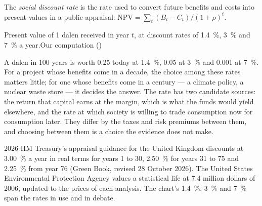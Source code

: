 \begin{definition}\label{def:b3:cost-benefit-analysis:discount-rate}
The \emph{social discount rate} is the rate used to convert future benefits and costs
into present values in a public appraisal: $\mathrm{NPV} = \sum_t (B_t - C_t)/(1 + \rho)^t$.
\end{definition}

\begin{omchart}{Present value of 1 dalen received in year $t$, at discount rates of
1.4~\%, 3~\% and 7~\% a year.}{Our computation ()}
\end{omchart}

A dalen in 100 years is worth 0.25 today at 1.4~\%, 0.05 at 3~\% and 0.001 at 7~\%. For a
project whose benefits come in a decade, the choice among these rates matters
little; for one whose benefits come in a century --- a climate policy, a nuclear
waste store --- it decides the answer. The rate has two candidate sources: the return
that capital earns at the margin, which is what the funds would yield elsewhere,
and the rate at which society is willing to trade consumption now for consumption
later. They differ by the taxes and risk premiums between them, and choosing
between them is a choice the evidence does not make.

\begin{dated}{2026}
HM Treasury's appraisal guidance for the United Kingdom discounts at 3.00~\% a year
in real terms for years 1 to 30, 2.50~\% for years 31 to 75 and 2.25~\% from year 76
(Green Book, revised 28 October 2026). %
The United States Environmental Protection Agency values a statistical life at 7.4
million dollars of 2006, updated to the prices of each analysis. %
The chart's 1.4~\%, 3~\% and 7~\% span the rates in use and in debate.
\end{dated}

